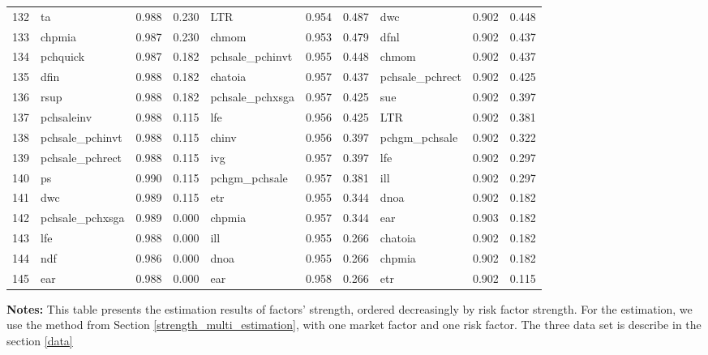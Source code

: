 \begin{landscape}
\begin{footnotesize}
\begin{longtable}{l|lcc|lcc|lcc}
  132 & ta & 0.988 & 0.230 & LTR & 0.954 & 0.487 & dwc & 0.902 & 0.448 \\ 
  133 & chpmia & 0.987 & 0.230 & chmom & 0.953 & 0.479 & dfnl & 0.902 & 0.437 \\ 
  134 & pchquick & 0.987 & 0.182 & pchsale\_pchinvt & 0.955 & 0.448 & chmom & 0.902 & 0.437 \\ 
  135 & dfin & 0.988 & 0.182 & chatoia & 0.957 & 0.437 & pchsale\_pchrect & 0.902 & 0.425 \\ 
  136 & rsup & 0.988 & 0.182 & pchsale\_pchxsga & 0.957 & 0.425 & sue & 0.902 & 0.397 \\ 
  137 & pchsaleinv & 0.988 & 0.115 & lfe & 0.956 & 0.425 & LTR & 0.902 & 0.381 \\ 
  138 & pchsale\_pchinvt & 0.988 & 0.115 & chinv & 0.956 & 0.397 & pchgm\_pchsale & 0.902 & 0.322 \\ 
  139 & pchsale\_pchrect & 0.988 & 0.115 & ivg & 0.957 & 0.397 & lfe & 0.902 & 0.297 \\ 
  140 & ps & 0.990 & 0.115 & pchgm\_pchsale & 0.957 & 0.381 & ill & 0.902 & 0.297 \\ 
  141 & dwc & 0.989 & 0.115 & etr & 0.955 & 0.344 & dnoa & 0.902 & 0.182 \\ 
  142 & pchsale\_pchxsga & 0.989 & 0.000 & chpmia & 0.957 & 0.344 & ear & 0.903 & 0.182 \\ 
  143 & lfe & 0.988 & 0.000 & ill & 0.955 & 0.266 & chatoia & 0.902 & 0.182 \\ 
  144 & ndf & 0.986 & 0.000 & dnoa & 0.955 & 0.266 & chpmia & 0.902 & 0.182 \\ 
  145 & ear & 0.988 & 0.000 & ear & 0.958 & 0.266 & etr & 0.902 & 0.115 \\ 
   \hline

\end{longtable}

			\begin{minipage}{1.4\textwidth}
	{\footnotesize {\bf Notes:} 
		This table presents the estimation results of factors' strength, ordered decreasingly by risk factor strength.
For the estimation, we use the method from Section \ref{strength_multi_estimation},  with one market factor and one risk factor.
The three data set is describe in the section \ref{data}}
\end{minipage}
\end{footnotesize}
\end{landscape}

